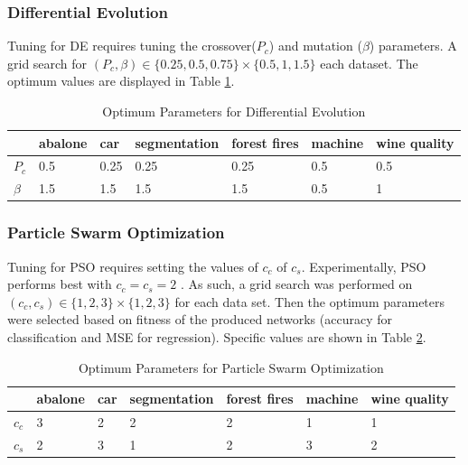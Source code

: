\documentclass[twoside,11pt]{article}
\begin{document}
\subsubsection{Differential Evolution}

	Tuning for DE requires tuning the crossover($P_c$) and mutation ($\beta$) parameters. A grid search for
	$(P_c, \beta) \in \{ 0.25, 0.5, 0.75 \} \times \{ 0.5, 1, 1.5 \}$
	each dataset.
	The optimum values are displayed in Table \ref{de-tuning-table}.
	\begin{table}[h]
		\centering
		\begin{tabular}{|l|l|l|l|l|l|l|}
			\hline
			       & abalone & car & segmentation & forest fires & machine & wine quality  \\ \hline
			$P_c$  &     0.5 & 0.25&         0.25 &         0.25 &     0.5 &          0.5  \\ \hline
			$\beta$&     1.5 & 1.5 &          1.5 &          1.5 &     0.5 &            1  \\ \hline
		\end{tabular}
		\caption{Optimum Parameters for Differential Evolution}
		\label{de-tuning-table}
	\end{table}

\subsubsection{Particle Swarm Optimization}

	Tuning for PSO requires setting the values of $c_c$ of $c_s$.
	Experimentally, PSO performs best with $c_c = c_s = 2$ \citep{empirical-pso}.
	As such, a grid search was performed on $ (c_c, c_s) \in \{ 1, 2, 3 \} \times \{ 1, 2, 3 \} $ for each data set.
	Then the optimum parameters were selected based on fitness of the produced networks (accuracy for classification and MSE for regression).
	Specific values are shown in Table \ref{pso-tuning-table}.
	\begin{table}[h]
		\centering
		\begin{tabular}{|l|l|l|l|l|l|l|}
			\hline
			       & abalone & car & segmentation & forest fires & machine & wine quality  \\ \hline
			$c_c$  &       3 &   2 &            2 &            2 &       1 &            1  \\ \hline
			$c_s$  &       2 &   3 &            1 &            2 &       3 &            2  \\ \hline
		\end{tabular}
		\caption{Optimum Parameters for Particle Swarm Optimization}
		\label{pso-tuning-table}
	\end{table}
\end{document}
